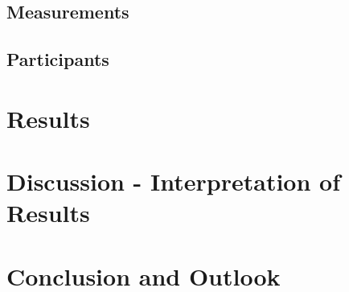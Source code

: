 \section{Measurements}

\section{Participants}

\chapter{Results}

\chapter{Discussion - Interpretation of Results}

\chapter{Conclusion and Outlook}
\label{sec:conclusion}

